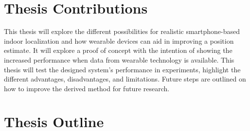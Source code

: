 \section{Thesis Contributions}
This thesis will explore the different possibilities for realistic smartphone-based indoor localization and how wearable devices can aid in improving a position estimate. It will explore a proof of concept with the intention of showing the increased performance when data from wearable technology is available. This thesis will test the designed system's performance in experiments, highlight the different advantages, disadvantages, and limitations. Future steps are outlined on how to improve the derived method for future research.

\section{Thesis Outline}